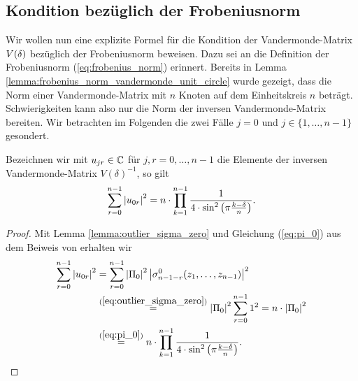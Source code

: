 \subsection{Kondition bezüglich der Frobeniusnorm}
Wir wollen nun eine explizite Formel für die Kondition der Vandermonde-Matrix
$V \! \left( \delta \right)$ bezüglich der Frobeniusnorm beweisen.
Dazu sei an die Definition der Frobeniusnorm (\ref{eq:frobenius_norm}) erinnert.
Bereits in Lemma \ref{lemma:frobenius_norm_vandermonde_unit_circle} wurde
gezeigt, dass die Norm einer Vandermonde-Matrix mit $n$ Knoten auf dem
Einheitskreis $n$ beträgt.
Schwierigkeiten kann also nur die Norm der inversen Vandermonde-Matrix
bereiten.  Wir betrachten im Folgenden die zwei Fälle $j=0$ und
$j \in \{1, \dots, n-1\}$ gesondert.

\begin{lemma}
    \label{lemma:inverse_outlier_zero_row_quadratic_sum}
    Bezeichnen wir mit $u_{jr} \in \mathbb{C}$ für $j, r = 0, \dots, n-1$ die Elemente
    der inversen Vandermonde-Matrix $V(\delta)^{-1}$, so gilt
    \[
        \sum_{r=0}^{n-1} \left\lvert u_{0r} \right\rvert^2
        = n \cdot \prod_{k=1}^{n-1} \frac{1}{4 \cdot \sin^2 \left( \pi \frac{k-\delta}{n} \right)}.
    \]
\end{lemma}
\begin{proof}
    Mit Lemma \ref{lemma:outlier_sigma_zero} und Gleichung (\ref{eq:pi_0}) aus
    dem Beiweis von 
    erhalten wir
    \[
        \begin{split}
            \sum_{r=0}^{n-1} \left\lvert u_{0r} \right\rvert^2
            &= \sum_{r=0}^{n-1} \left\lvert \Pi_0 \right\rvert^2 \left\lvert \sigma_{n-1-r}^{0}(z_1, \dots, z_{n-1}) \right\rvert^2\\
            &\overset{(\ref{eq:outlier_sigma_zero})}=
                \left\lvert \Pi_0 \right\rvert^2 \sum_{r=0}^{n-1} 1^2
            = n \cdot \left\lvert \Pi_0 \right\rvert^2\\
            &\overset{(\ref{eq:pi_0})}=
                n \cdot \prod_{k=1}^{n-1} \frac{1}{4 \cdot \sin^2 \left( \pi \frac{k-\delta}{n} \right)}.
        \end{split}
    \]
\end{proof}

